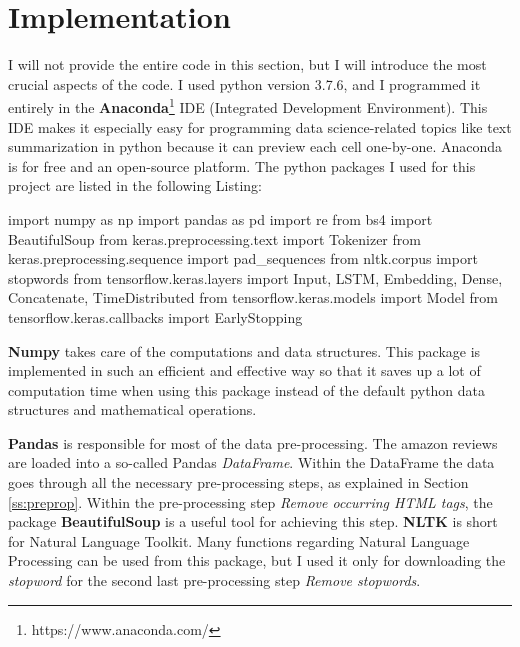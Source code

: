 \section{Implementation}\label{ss:imp}

I will not provide the entire code in this section, but I will introduce the most crucial aspects of the code. I used python version 3.7.6, and I programmed it entirely in the \textbf{Anaconda}\footnote{https://www.anaconda.com/} IDE (Integrated Development Environment). This IDE makes it especially easy for programming data science-related topics like text summarization in python because it can preview each cell one-by-one. Anaconda is for free and an open-source platform. The python packages I used for this project are listed in the following Listing:

\begin{python}
import numpy as np  
import pandas as pd 
import re           
from bs4 import BeautifulSoup 
from keras.preprocessing.text import Tokenizer 
from keras.preprocessing.sequence import pad_sequences
from nltk.corpus import stopwords   
from tensorflow.keras.layers import Input, LSTM, Embedding, Dense, Concatenate, TimeDistributed
from tensorflow.keras.models import Model
from tensorflow.keras.callbacks import EarlyStopping
\end{python}

\textbf{Numpy} takes care of the computations and data structures. This package is implemented in such an efficient and effective way so that it saves up a lot of computation time when using this package instead of the default python data structures and mathematical operations.

\textbf{Pandas} is responsible for most of the data pre-processing. The amazon reviews are loaded into a so-called Pandas \textit{DataFrame}. Within the DataFrame the data goes through all the necessary pre-processing steps, as explained in Section \ref{ss:preprop}. Within the pre-processing step \textit{Remove occurring HTML tags}, the package \textbf{BeautifulSoup} is a useful tool for achieving this step. \textbf{NLTK} is short for Natural Language Toolkit. Many functions regarding Natural Language Processing can be used from this package, but I used it only for downloading the \textit{stopword} for the second last pre-processing step \textit{Remove stopwords}.

